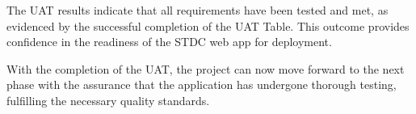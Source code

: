 \begin{justify}
\vspace{0.25cm}
\newendline The UAT results indicate that all requirements have been tested and met, as evidenced by the successful completion of the UAT Table. This outcome provides confidence in the readiness of the STDC web app for deployment.

\vspace{0.25cm}
\newendline With the completion of the UAT, the project can now move forward to the next phase with the assurance that the application has undergone thorough testing, fulfilling the necessary quality standards.

\end{justify}
\clearpage

